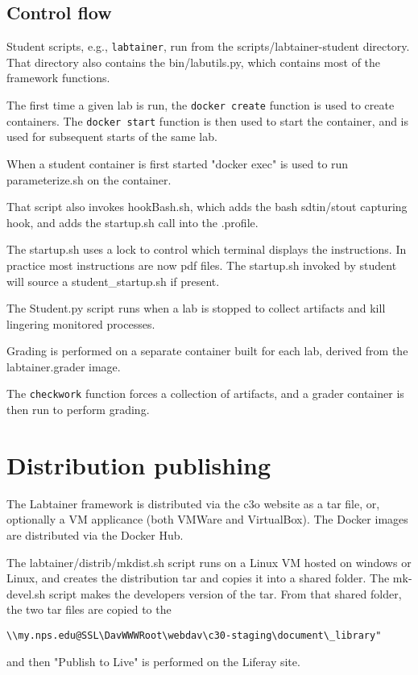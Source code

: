 \documentclass[12pt]{article}
\begin{document}
\subsection{Control flow}
Student scripts, e.g., {\tt labtainer}, run from the scripts/labtainer-student directory.
That directory also contains the bin/labutils.py, which contains most of the framework
functions.

The first time a given lab is run, the {\tt docker create} function is
used to create containers.  The {\tt docker start} function is then used to start
the container, and is used for subsequent starts of the same lab.

When a student container is first started "docker exec" is used
to run parameterize.sh on the container.

That script also invokes hookBash.sh, which adds the bash
sdtin/stout capturing hook, and adds the startup.sh call
into the .profile.

The startup.sh uses a lock to control which
terminal displays the instructions.  In practice most
instructions are now pdf files.
The startup.sh invoked by student will source a student\_startup.sh if present.

The Student.py script runs when a lab is stopped to collect artifacts and kill lingering
monitored processes.

Grading is performed on a separate container built for each lab, derived from the 
labtainer.grader image.

The {\tt checkwork} function forces a collection of artifacts, and a grader container
is then run to perform grading.

\section{Distribution publishing}
The Labtainer framework is distributed via the c3o website as a tar file, or, optionally a
VM applicance (both VMWare and VirtualBox).  The Docker images are distributed via the Docker Hub.

The labtainer/distrib/mkdist.sh script runs on a Linux VM hosted on windows or Linux, and creates the distribution tar 
and copies it into a shared folder.  The mk-devel.sh script makes the developers version of the tar.
From that shared folder, the two tar files are copied to the 
\begin{verbatim}
\\my.nps.edu@SSL\DavWWWRoot\webdav\c30-staging\document\_library" 
\end{verbatim}
\noindent and then "Publish to Live" is 
performed on the Liferay site.
\end{document}
